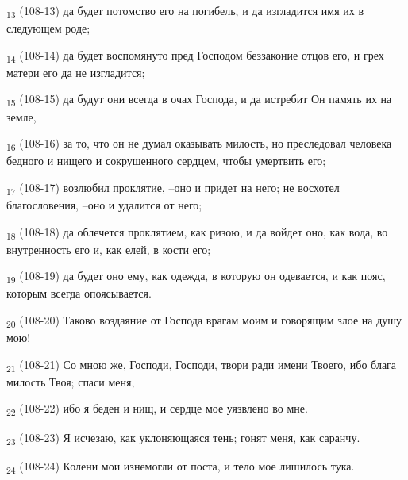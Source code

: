 \begin{tcolorbox}
\textsubscript{13} (108-13) да будет потомство его на погибель, и да изгладится имя их в следующем роде;
\end{tcolorbox}
\begin{tcolorbox}
\textsubscript{14} (108-14) да будет воспомянуто пред Господом беззаконие отцов его, и грех матери его да не изгладится;
\end{tcolorbox}
\begin{tcolorbox}
\textsubscript{15} (108-15) да будут они всегда в очах Господа, и да истребит Он память их на земле,
\end{tcolorbox}
\begin{tcolorbox}
\textsubscript{16} (108-16) за то, что он не думал оказывать милость, но преследовал человека бедного и нищего и сокрушенного сердцем, чтобы умертвить его;
\end{tcolorbox}
\begin{tcolorbox}
\textsubscript{17} (108-17) возлюбил проклятие, --оно и придет на него; не восхотел благословения, --оно и удалится от него;
\end{tcolorbox}
\begin{tcolorbox}
\textsubscript{18} (108-18) да облечется проклятием, как ризою, и да войдет оно, как вода, во внутренность его и, как елей, в кости его;
\end{tcolorbox}
\begin{tcolorbox}
\textsubscript{19} (108-19) да будет оно ему, как одежда, в которую он одевается, и как пояс, которым всегда опоясывается.
\end{tcolorbox}
\begin{tcolorbox}
\textsubscript{20} (108-20) Таково воздаяние от Господа врагам моим и говорящим злое на душу мою!
\end{tcolorbox}
\begin{tcolorbox}
\textsubscript{21} (108-21) Со мною же, Господи, Господи, твори ради имени Твоего, ибо блага милость Твоя; спаси меня,
\end{tcolorbox}
\begin{tcolorbox}
\textsubscript{22} (108-22) ибо я беден и нищ, и сердце мое уязвлено во мне.
\end{tcolorbox}
\begin{tcolorbox}
\textsubscript{23} (108-23) Я исчезаю, как уклоняющаяся тень; гонят меня, как саранчу.
\end{tcolorbox}
\begin{tcolorbox}
\textsubscript{24} (108-24) Колени мои изнемогли от поста, и тело мое лишилось тука.
\end{tcolorbox}
